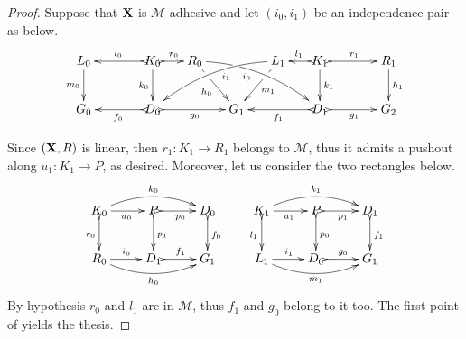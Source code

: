 \documentclass[a4paper,UKenglish,cleveref,pdftex, thm-restate,numberwithinsect,anonymous]{lipics}
\def\R{\mathsf{R}}
\def\X{\textbf {\textup{X}}}
\def\G{\textbf {\textup{G}}}
\begin{document}
\propEqui*
\label{propEqui-proof}

\begin{proof}
  Suppose that $\X$ is $\mathcal{M}$-adhesive and let $(i_0, i_1)$ be
  an independence pair as below.
  \[
    \xymatrix@C=15pt{L_0 \ar[d]_{m_0}&& K_0
      \ar[d]_{k_0}\ar@{>->}[ll]_{l_0} \ar@{>->}[r]^{r_0} & R_0
      \ar@/^.35cm/[drrr]|(.3)\hole_(.4){i_0} \ar[dr]|(.3)\hole_{h_0}
      && L_1 \ar@/_.35cm/[dlll]^(.4){i_1} \ar[dl]|(.3)\hole^{m_1}& K_1
      \ar[d]^{k_1}\ar@{>->}[l]_{l_1} \ar@{>->}[rr]^{r_1} && R_1
      \ar[d]^{h_1} \\G_0 && \ar@{>->}[ll]^{f_0} D_0
      \ar@{>->}[rr]_{g_0}&& G_1 && \ar@{>->}[ll]^{f_1} D_1
      \ar@{>->}[rr]_{g_1}&& G_2}\]

  Since $(\X, \R)$ is linear, then $r_1\colon K_1\to R_1$ belongs to
  $\mathcal{M}$, thus it admits a pushout along $u_1\colon K_1\to P$,
  as desired. Moreover, let us consider the two rectangles below.
  \[
    \xymatrix{K_0 \ar@/^.4cm/[rr]^{k_0}\ar@{>->}[d]_{r_0}\ar[r]_{u_0}
      &P\ar@{>->}[d]^{p_1} \ar@{>->}[r]_{p_0} & D_0
      \ar@{>->}[d]^{f_0}& K_1
      \ar@/^.4cm/[rr]^{k_1}\ar@{>->}[d]_{l_1}\ar[r]_{u_1}
      &P\ar@{>->}[d]^{p_0} \ar@{>->}[r]_{p_1} & D_1
      \ar@{>->}[d]^{f_1}\\ R_0 \ar@/_.4cm/[rr]_{h_0} \ar[r]^{i_0}&D_1
      \ar@{>->}[r]^{f_1} & G_1& L_1 \ar@/_.4cm/[rr]_{m_1}
      \ar[r]^{i_1}&D_0 \ar@{>->}[r]^{g_0} & G_1} \] By hypothesis
  $r_0$ and $l_1$ are in $\mathcal{M}$, thus $f_1$ and $g_0$ belong to
  it too. The first point of  yields the thesis.
\end{proof}
\end{document}
